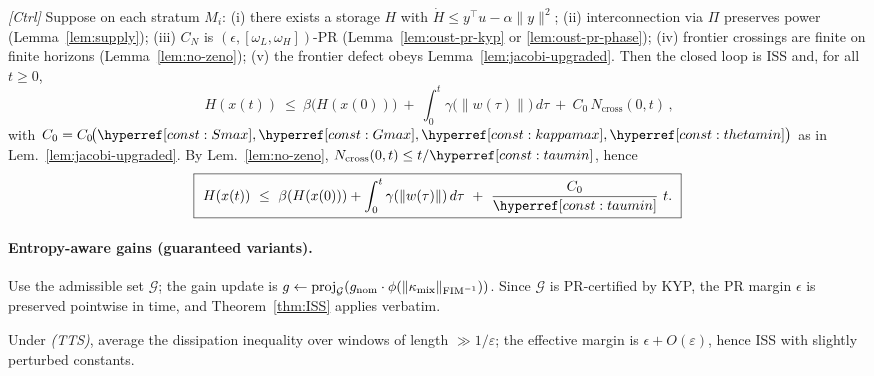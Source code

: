 \begin{theorem}\label{thm:ISS}
\emph{[\textup{Ctrl}]} Suppose on each stratum $M_i$: 
(i) there exists a storage $H$ with $\dot H\le y^\top u - \alpha\|y\|^2$; 
(ii) interconnection via $\Pi$ preserves power (Lemma~\ref{lem:supply}); 
(iii) $C_N$ is $(\epsilon,[\omega_L,\omega_H])$-PR (Lemma~\ref{lem:oust-pr-kyp} or \ref{lem:oust-pr-phase}); 
(iv) frontier crossings are finite on finite horizons (Lemma~\ref{lem:no-zeno}); 
(v) the frontier defect obeys Lemma~\ref{lem:jacobi-upgraded}. Then the closed loop is ISS and, for all $t\ge0$,
\[
\boxed{\
H(x(t)) \ \le\ \beta\!\big(H(x(0))\big) \ +\ \int_0^t \gamma\!\big(\|w(\tau)\|\big)\,d\tau \ +\ C_0\,N_{\mathrm{cross}}(0,t)\,,
}
\]
with $C_0=C_0\!\big(\constref{Smax},\constref{Gmax},\constref{kappamax},\constref{thetamin}\big)$ as in Lem.~\ref{lem:jacobi-upgraded}. 
By Lem.~\ref{lem:no-zeno}, $N_{\mathrm{cross}}(0,t)\le t/\constref{taumin}$, hence
\[
\boxed{\ H(x(t)) \ \le\ \beta(H(x(0))) + \int_0^t \gamma(\|w(\tau)\|)\,d\tau \ +\ \frac{C_0}{\constref{taumin}}\ t.\ }
\]
\end{theorem}

\paragraph{Entropy-aware gains (guaranteed variants).}
\begin{description}[leftmargin=*,style=nextline]
\item[Projection policy (preferred).] Use the admissible set $\mathcal G$; the gain update is $g\leftarrow\mathrm{proj}_{\mathcal G}(g_{\mathrm{nom}}\cdot \phi(\|\kappa_{\mathrm{mix}}\|_{\mathrm{FIM}^{-1}}))$. Since $\mathcal G$ is PR-certified by KYP, the PR margin $\epsilon$ is preserved pointwise in time, and Theorem~\ref{thm:ISS} applies verbatim.
\item[Two-time-scale policy.] Under \emph{(TTS)}, average the dissipation inequality over windows of length $\gg 1/\varepsilon$; the effective margin is $\epsilon+O(\varepsilon)$, hence ISS with slightly perturbed constants.
\end{description}

